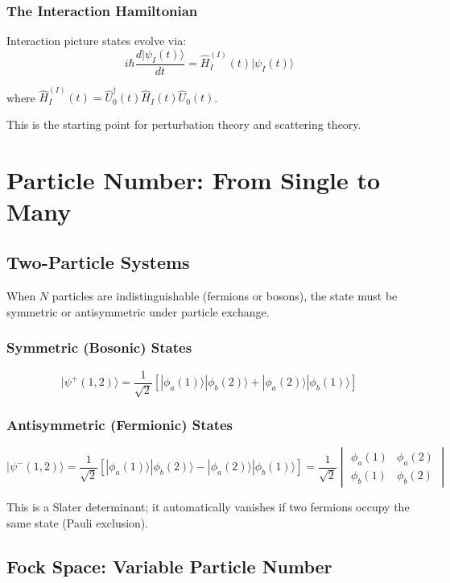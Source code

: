 \documentclass[12pt,openany,oneside]{book}
\newcommand{\ket}[1]{|#1\rangle}
\begin{document}
{{{\subsection{The Interaction Hamiltonian}

Interaction picture states evolve via:
\[
i\hbar\frac{d\ket{\psi_I(t)}}{dt} = \hat{H}_I^{(I)}(t)\ket{\psi_I(t)}
\]

where $\hat{H}_I^{(I)}(t) = \hat{U}_0^\dagger(t)\hat{H}_I(t)\hat{U}_0(t)$.

This is the starting point for perturbation theory and scattering theory.

\chapter{Particle Number: From Single to Many}

\section{Two-Particle Systems}

When $N$ particles are indistinguishable (fermions or bosons), the state must be symmetric or antisymmetric under particle exchange.

\subsection{Symmetric (Bosonic) States}

\[
\ket{\psi^{+}(1,2)} = \frac{1}{\sqrt{2}}[\ket{\phi_a(1)}\ket{\phi_b(2)} + \ket{\phi_a(2)}\ket{\phi_b(1)}]
\]

\subsection{Antisymmetric (Fermionic) States}

\[
\ket{\psi^{-}(1,2)} = \frac{1}{\sqrt{2}}[\ket{\phi_a(1)}\ket{\phi_b(2)} - \ket{\phi_a(2)}\ket{\phi_b(1)}] = \frac{1}{\sqrt{2}}\begin{vmatrix} \phi_a(1) & \phi_a(2) \\ \phi_b(1) & \phi_b(2) \end{vmatrix}
\]

This is a Slater determinant; it automatically vanishes if two fermions occupy the same state (Pauli exclusion).

\section{Fock Space: Variable Particle Number}

}}}
\end{document}
